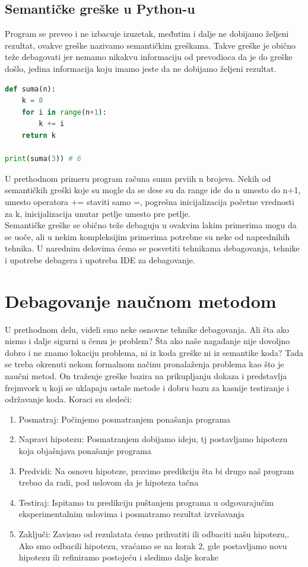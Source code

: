 \documentclass[a4paper]{article}
\begin{document}
\subsection{Semantičke greške u Python-u}	
Program se preveo i ne izbacuje izuzetak, međutim i dalje ne dobijamo željeni rezultat, ovakve greške nazivamo semantičkim greškama. Takve greške je obično teže debagovati jer nemamo nikakvu informaciju od prevodioca da je do greške došlo, jedina informacija koju imamo jeste da ne dobijamo željeni rezultat. 
\begin{lstlisting}[language = python, caption = {Računanje sume prvih n brojeva}]
def suma(n):
    k = 0
    for i in range(n+1):
        k += i
    return k

print(suma(3)) # 6
\end{lstlisting}
U prethodnom primeru program računa sumu prviih n brojeva. Nekih od semantičkih greški koje su mogle da se dese su da range ide do n umesto do n+1, umesto operatora += staviti samo =, pogrešna inicijalizacija početne vrednosti za k, inicijalizacija unutar petlje umesto pre petlje.\\
Semantičke greške se obično teže debaguju u ovakvim lakim primerima mogu da se uoče, ali u nekim kompleksijim primerima potrebne su neke od naprednihih tehnika. U narednim delovima ćemo se posvetiti tehnikama debagovanja, tehnike i upotrebe debagera i upotreba IDE za debagovanje.

\section{Debagovanje naučnom metodom}
U prethodnom delu, videli smo neke osnovne tehnike debagovanja. Ali šta ako nismo i dalje sigurni u čemu je problem? Šta ako naše nagađanje nije dovoljno dobro i ne znamo lokaciju problema, ni iz koda greške ni iz semantike koda? Tada se treba okrenuti nekom formalnom načinu pronalaženja problema kao što je naučni metod. On traženje greške bazira na prikupljanju dokaza i predstavlja frejmvork u koji se uklapaju ostale metode i dobru bazu za kasnije testiranje i održavanje koda.
	 Koraci su sledeći\cite{proPyDeb}:
	 \begin{enumerate}
	     \item Posmatraj: Počinjemo posmatranjem ponašanja programa 
	     \item Napravi hipotezu: Posmatranjem dobijamo ideju, tj postavljamo hipotezu koja objašnjava ponašanje programa
	     \item Predvidi: Na osnovu hipoteze, pravimo predikciju šta bi drugo naš program trebao da radi, pod uslovom da je hipoteza tačna
	     \item Testiraj: Ispitamo tu predikciju puštanjem programa u odgovarajućim eksperimentalnim uslovima i posmatramo rezultat izvršavanja
	     \item Zaključi: Zavisno od rezulatata ćemo prihvatiti ili odbaciti našu hipotezu,. Ako smo odbacili hipotezu, vraćamo se na korak 2, gde postavljamo novu hipotezu ili refiniramo postojeću i sledimo dalje korake
	 \end{enumerate}
\end{document}
